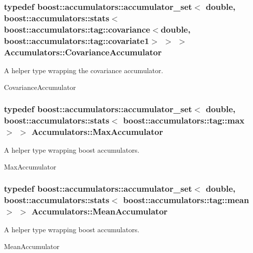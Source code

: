 \subsubsection[{\texorpdfstring{Covariance\+Accumulator}{CovarianceAccumulator}}]{\setlength{\rightskip}{0pt plus 5cm}typedef boost\+::accumulators\+::accumulator\+\_\+set$<$ double, boost\+::accumulators\+::stats$<$ boost\+::accumulators\+::tag\+::covariance$<$double, boost\+::accumulators\+::tag\+::covariate1$>$ $>$ $>$ {\bf Accumulators\+::\+Covariance\+Accumulator}}\hypertarget{namespaceAccumulators_a69e0958469bde3d2198062b52880ec68}{}\label{namespaceAccumulators_a69e0958469bde3d2198062b52880ec68}


A helper type wrapping the covariance accumulator. 

Covariance\+Accumulator 
\subsubsection[{\texorpdfstring{Max\+Accumulator}{MaxAccumulator}}]{\setlength{\rightskip}{0pt plus 5cm}typedef boost\+::accumulators\+::accumulator\+\_\+set$<$ double, boost\+::accumulators\+::stats$<$ boost\+::accumulators\+::tag\+::max $>$ $>$ {\bf Accumulators\+::\+Max\+Accumulator}}\hypertarget{namespaceAccumulators_ae68012df9b3c9adaca0807437b8b0129}{}\label{namespaceAccumulators_ae68012df9b3c9adaca0807437b8b0129}


A helper type wrapping boost accumulators. 

Max\+Accumulator 
\subsubsection[{\texorpdfstring{Mean\+Accumulator}{MeanAccumulator}}]{\setlength{\rightskip}{0pt plus 5cm}typedef boost\+::accumulators\+::accumulator\+\_\+set$<$ double, boost\+::accumulators\+::stats$<$ boost\+::accumulators\+::tag\+::mean $>$ $>$ {\bf Accumulators\+::\+Mean\+Accumulator}}\hypertarget{namespaceAccumulators_a42d249e1cf4e4f6c496ab61b7372cf4a}{}\label{namespaceAccumulators_a42d249e1cf4e4f6c496ab61b7372cf4a}


A helper type wrapping boost accumulators. 

Mean\+Accumulator 
